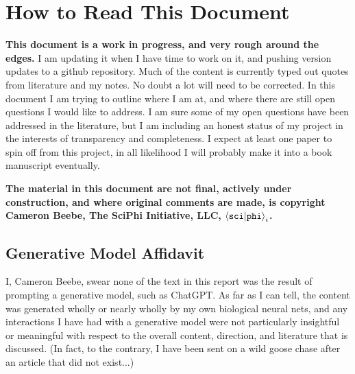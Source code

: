 \tableofcontents




\section{How to Read This Document}

\textbf{This document is a work in progress, and very rough around the edges.} I am updating it when I have time to work on it, and pushing version updates to a github repository.  Much of the content is currently typed out quotes from literature and my notes.  No doubt a lot will need to be corrected.  In this document I am trying to outline where I am at, and where there are still open questions I would like to address.  I am sure some of my open questions have been addressed in the literature, but I am including an honest status of my project in the interests of transparency and completeness.  I expect at least one paper to spin off from this project, in all likelihood I will probably make it into a book manuscript eventually.

\textbf{The material in this document are not final, actively under construction, and where original comments are made, is copyright Cameron Beebe, The SciPhi Initiative, LLC, $\braket{\texttt{sci}|\texttt{phi}}_i$.}




\subsection{Generative Model Affidavit}

I, Cameron Beebe, swear none of the text in this report was the result of prompting a generative model, such as ChatGPT.  As far as I can tell, the content was generated wholly or nearly wholly by my own biological neural nets, and any interactions I have had with a generative model were not particularly insightful or meaningful with respect to the overall content, direction, and literature that is discussed.  (In fact, to the contrary, I have been sent on a wild goose chase after an article that did not exist...)

